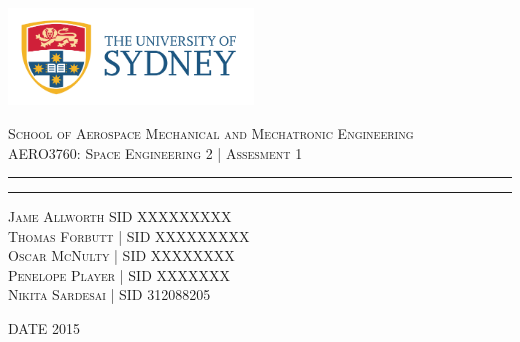 \begin{titlepage}

\thispagestyle{empty}
\begin{center}
\begin{minipage}{\linewidth}
    \centering
    \includegraphics[width=6.5cm]{logo.png}
    \par
    \vspace{1.2cm}
    {\textsc{School of Aerospace Mechanical and Mechatronic Engineering \\ \vspace{0.3cm}
            AERO3760: Space Engineering 2 | Assesment 1}}
   \vspace{0.7cm}
	\hrule
    \vspace{1.5cm}
    {{\LARGE{}\par}}

    \vspace{1.5cm}
    \hrule
    \vspace{1.3cm}
    {\large \textsc{Jame Allworth SID XXXXXXXXX \\
                    Thomas Forbutt | SID XXXXXXXXX \\
                    Oscar McNulty | SID XXXXXXXX  \\
                    Penelope Player | SID XXXXXXX \\
                    Nikita Sardesai | SID 312088205 \ }\par}
    \vspace{0.5cm}

    {\large \textsc{DATE 2015}}
    
    \vspace{1.8cm}
    {\large{}}
    \vspace{0.4cm}
    \justify
    {\begin{spacing}{1.3} \lipsum[10] \end{spacing}\par}
\end{minipage}
\end{center}

\end{titlepage}